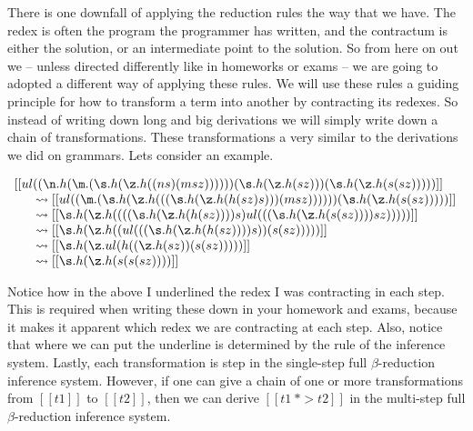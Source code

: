 \documentclass{article}
\begin{document}
There is one downfall of applying the reduction rules the way that we
have.  The redex is often the program the programmer has written, and
the contractum is either the solution, or an intermediate point to the
solution.  So from here on out we -- unless directed differently like
in homeworks or exams -- we are going to adopted a different way of
applying these rules.  We will use these rules a guiding principle for
how to transform a term into another by contracting its redexes.  So
instead of writing down long and big derivations we will simply write
down a chain of transformations.  These transformations a very similar
to the derivations we did on grammars.  Lets consider an example.
\begin{center}
  \begin{math}
    \begin{array}{lll}
      [[ul((\n.h(\m.(\s.h(\z.h((n s) (m s z)))))) (\s.h(\z.h(s z))) (\s.h(\z.h(s (s z)))))]] \\
      \,\,\,\,\,\,\,\,\,\,\rightsquigarrow [[ul((\m.(\s.h(\z.h(((\s.h(\z.h(h(s z) s))) (m s z)))))) (\s.h(\z.h(s (s z)))))]]\\
      \,\,\,\,\,\,\,\,\,\,\rightsquigarrow [[\s.h(\z.h((((\s.h(\z.h(h(s z)))) s) ul(((\s.h(\z.h(s (s z)))) s z)))))]]\\
      \,\,\,\,\,\,\,\,\,\,\rightsquigarrow [[\s.h(\z.h((ul(((\s.h(\z.h(h(s z)))) s)) (s (s z)))))]]\\
      \,\,\,\,\,\,\,\,\,\,\rightsquigarrow [[\s.h(\z.ul(h((\z.h(s z)) (s (s z)))))]]\\
      \,\,\,\,\,\,\,\,\,\,\rightsquigarrow [[\s.h(\z.h(s (s (s z))))]]\\
    \end{array}
  \end{math}
\end{center}
Notice how in the above I underlined the redex I was contracting in
each step.  This is required when writing these down in your homework
and exams, because it makes it apparent which redex we are contracting
at each step.  Also, notice that where we can put the underline is
determined by the rule of the inference system.  Lastly, each
transformation is step in the single-step full $\beta$-reduction
inference system.  However, if one can give a chain of one or more
transformations from $[[t1]]$ to $[[t2]]$, then we can derive $[[t1
~*> t2]]$ in the multi-step full $\beta$-reduction inference system.
\end{document}
